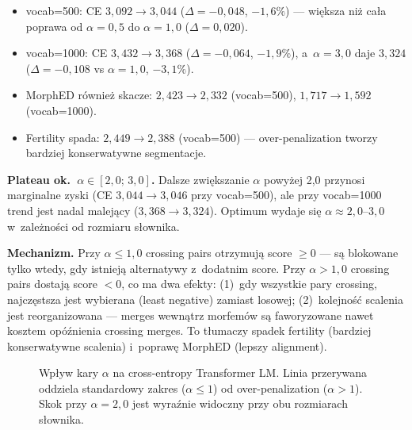 \begin{itemize}
  \item vocab=500: CE $3{,}092 \to 3{,}044$ ($\Delta = -0{,}048$,
        $-1{,}6\%$) --- większa niż cała poprawa od $\alpha = 0{,}5$
        do $\alpha = 1{,}0$ ($\Delta = 0{,}020$).
  \item vocab=1000: CE $3{,}432 \to 3{,}368$ ($\Delta = -0{,}064$,
        $-1{,}9\%$), a~$\alpha = 3{,}0$ daje $3{,}324$
        ($\Delta = -0{,}108$ vs $\alpha = 1{,}0$, $-3{,}1\%$).
  \item MorphED również skacze: $2{,}423 \to 2{,}332$ (vocab=500),
        $1{,}717 \to 1{,}592$ (vocab=1000).
  \item Fertility spada: $2{,}449 \to 2{,}388$ (vocab=500) ---
        over-penalization tworzy bardziej konserwatywne segmentacje.
\end{itemize}

\textbf{Plateau ok.~$\alpha \in [2{,}0;\, 3{,}0]$.} Dalsze zwiększanie
$\alpha$ powyżej 2{,}0 przynosi marginalne zyski (CE $3{,}044 \to
3{,}046$ przy vocab=500), ale przy vocab=1000 trend jest nadal
malejący ($3{,}368 \to 3{,}324$). Optimum wydaje się $\alpha \approx
2{,}0$--$3{,}0$ w~zależności od rozmiaru słownika.

\textbf{Mechanizm.} Przy $\alpha \le 1{,}0$ crossing pairs otrzymują
score $\ge 0$ --- są blokowane tylko wtedy, gdy istnieją alternatywy
z~dodatnim score. Przy $\alpha > 1{,}0$ crossing pairs dostają
score $< 0$, co ma dwa efekty: (1)~gdy wszystkie pary crossing,
najczęstsza jest wybierana (least negative) zamiast losowej;
(2)~kolejność scalenia jest reorganizowana --- merges wewnątrz
morfemów są faworyzowane nawet kosztem opóźnienia crossing merges.
To tłumaczy spadek fertility (bardziej konserwatywne scalenia)
i~poprawę MorphED (lepszy alignment).

\begin{figure}[h]
  \centering
  \caption{Wpływ kary $\alpha$ na cross-entropy Transformer LM.
  Linia przerywana oddziela standardowy zakres ($\alpha \le 1$)
  od over-penalization ($\alpha > 1$). Skok przy $\alpha = 2{,}0$
  jest wyraźnie widoczny przy obu rozmiarach słownika.}
  \label{fig:alpha-sweep}
\end{figure}

